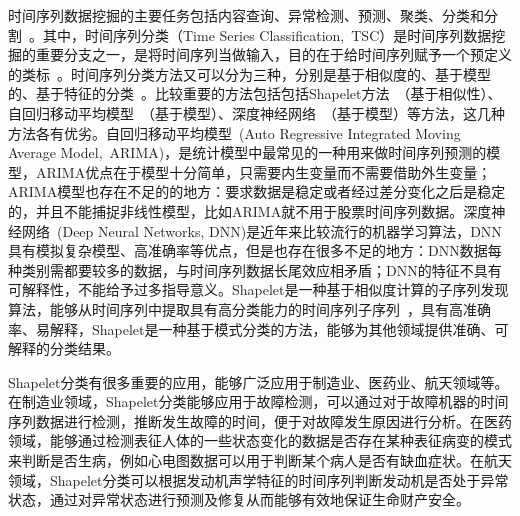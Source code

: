 时间序列数据挖掘的主要任务包括内容查询、异常检测、预测、聚类、分类和分割~\cite{esling2012time}。其中，时间序列分类（Time  Series Classification,~TSC）是时间序列数据挖掘的重要分支之一，是将时间序列当做输入，目的在于给时间序列赋予一个预定义的类标~\cite{wei2006semi}。时间序列分类方法又可以分为三种，分别是基于相似度的、基于模型的、基于特征的分类~\cite{xing2010brief,fakhrazarisurvey}。比较重要的方法包括包括Shapelet方法~\cite{hills2014classification,mueen2011logical}（基于相似性）、自回归移动平均模型~\cite{saboia1977autoregressive}（基于模型）、深度神经网络~\cite{wang2017time}（基于模型）等方法，这几种方法各有优劣。自回归移动平均模型~\cite{earnest2005using}(Auto Regressive Integrated Moving Average Model,~ARIMA)，是统计模型中最常见的一种用来做时间序列预测的模型，ARIMA优点在于模型十分简单，只需要内生变量而不需要借助外生变量；ARIMA模型也存在不足的的地方：要求数据是稳定或者经过差分变化之后是稳定的，并且不能捕捉非线性模型，比如ARIMA就不用于股票时间序列数据。深度神经网络~\cite{zheng2014time}(Deep Neural Networks, DNN)是近年来比较流行的机器学习算法，DNN具有模拟复杂模型、高准确率等优点，但是也存在很多不足的地方：DNN数据每种类别需都要较多的数据，与时间序列数据长尾效应相矛盾；DNN的特征不具有可解释性，不能给予过多指导意义。Shapelet是一种基于相似度计算的子序列发现算法，能够从时间序列中提取具有高分类能力的时间序列子序列~\cite{hou2016efficient}，具有高准确率、易解释，Shapelet是一种基于模式分类的方法，能够为其他领域提供准确、可解释的分类结果。

Shapelet分类有很多重要的应用，能够广泛应用于制造业、医药业、航天领域等。在制造业领域，Shapelet分类能够应用于故障检测，可以通过对于故障机器的时间序列数据进行检测，推断发生故障的时间，便于对故障发生原因进行分析。在医药领域，能够通过检测表征人体的一些状态变化的数据是否存在某种表征病变的模式来判断是否生病，例如心电图数据可以用于判断某个病人是否有缺血症状。在航天领域，Shapelet分类可以根据发动机声学特征的时间序列判断发动机是否处于异常状态，通过对异常状态进行预测及修复从而能够有效地保证生命财产安全。

